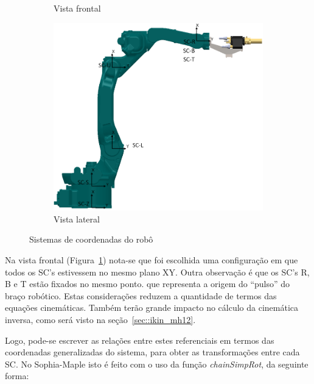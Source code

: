\begin{figure}[h]
\begin{subfigure}[b]{0.20\textwidth}
        \caption{Vista frontal}
        \label{fig::sc_front}
    \end{subfigure}
    \quad %
    \begin{subfigure}[b]{0.7\textwidth}
        \includegraphics[width=\textwidth]{figs/sc_lat}
        \caption{Vista lateral}
        \label{fig::sc_lat}
    \end{subfigure}
    \caption{Sistemas de coordenadas do robô}\label{fig::scs}
\end{figure}

Na vista frontal (Figura~\ref{fig::sc_front}) nota-se que foi escolhida uma
configuração em que todos os SC's estivessem no mesmo plano XY. Outra observação
é que os SC's R, B e T estão fixados no mesmo ponto. que representa a origem do
``pulso'' do braço robótico. Estas considerações reduzem a quantidade de termos
das equações cinemáticas. Também terão grande impacto no cálculo da cinemática
inversa, como será visto na seção~\ref{sec::ikin_mh12}.

Logo, pode-se escrever as relações entre estes referenciais em termos das
coordenadas generalizadas do sistema, para obter as transformações entre cada
SC. No Sophia-Maple isto é feito com o uso da função \textit{chainSimpRot}, da
seguinte forma:

\medskip {} \medskip 

